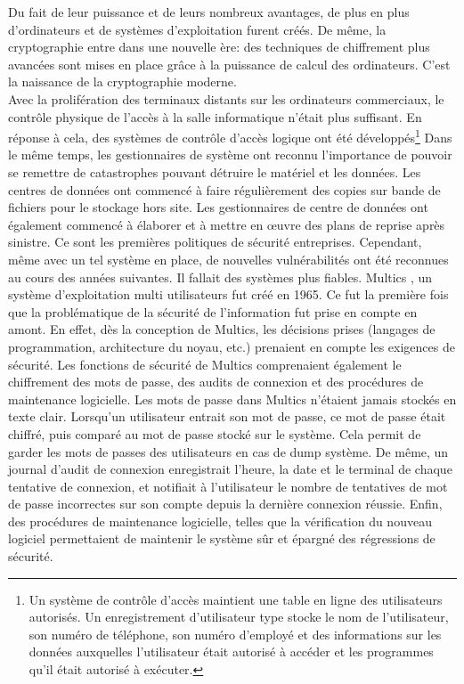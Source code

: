 Du fait de leur puissance et de leurs nombreux avantages, de plus en plus d’ordinateurs et de systèmes d’exploitation furent créés. De même, la cryptographie entre dans une nouvelle ère: des techniques de chiffrement plus avancées sont mises en place grâce à la puissance de calcul des ordinateurs. C’est la naissance de la cryptographie moderne.\\
Avec la prolifération des terminaux distants sur les ordinateurs commerciaux, le contrôle physique de l'accès à la salle informatique n'était plus suffisant. En réponse à cela, des systèmes de contrôle d'accès logique ont été développés\footnote{Un système de contrôle d'accès maintient une table en ligne des utilisateurs autorisés. Un enregistrement d'utilisateur type stocke le nom de l'utilisateur, son numéro de téléphone, son numéro d'employé et des informations sur les données auxquelles l'utilisateur était autorisé à accéder et les programmes qu'il était autorisé à exécuter.} Dans le même temps, les gestionnaires de système ont reconnu l'importance de pouvoir se remettre de catastrophes pouvant détruire le matériel et les données. Les centres de données ont commencé à faire régulièrement des copies sur bande de fichiers pour le stockage hors site. Les gestionnaires de centre de données ont également commencé à élaborer et à mettre en œuvre des plans de reprise après sinistre. Ce sont les premières politiques de sécurité entreprises. Cependant, même avec un tel système en place, de nouvelles vulnérabilités ont été reconnues au cours des années suivantes. Il fallait des systèmes plus fiables. 
Multics \cite{multics} , un système d’exploitation multi utilisateurs fut créé en 1965. Ce fut la première fois que la problématique de la sécurité de l’information fut prise en compte en amont. En effet, dès la conception de Multics, les décisions prises (langages de programmation, architecture du noyau, etc.) prenaient en compte les exigences de sécurité. Les fonctions de sécurité de Multics comprenaient également le chiffrement des mots de passe, des audits de connexion et des procédures de maintenance logicielle. Les mots de passe dans Multics n’étaient jamais stockés en texte clair. Lorsqu'un utilisateur entrait son mot de passe, ce mot de passe était chiffré, puis comparé au mot de passe stocké sur le système. Cela permit de garder les mots de passes des utilisateurs en cas de dump système. De même, un journal d'audit de connexion enregistrait l'heure, la date et le terminal de chaque tentative de connexion, et notifiait à l'utilisateur le nombre de tentatives de mot de passe incorrectes sur son compte depuis la dernière connexion réussie. Enfin, des procédures de maintenance logicielle, telles que la vérification du nouveau logiciel permettaient de maintenir le système sûr et épargné des régressions de sécurité. 
